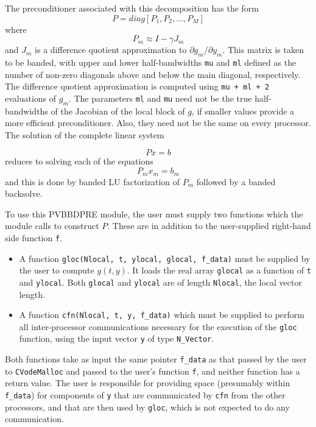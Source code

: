 The preconditioner associated with this decomposition has the form 
\begin{equation}
P= diag[P_1, P_2, \ldots, P_M]
\end{equation}
where 
\begin{equation}
P_m \approx I - \gamma J_m
\end{equation}
and $J_m$ is a difference quotient approximation to 
$\partial g_m/\partial y_m$. This matrix is taken to be banded, with
upper and lower half-bandwidths {\tt mu} and {\tt ml} defined as
the number of non-zero diagonals above and below the main diagonal,
respectively. The difference quotient approximation is computed using
{\tt mu + ml + 2} evaluations of $g_m$. The parameters {\tt ml} and
{\tt mu} need not be the true half-bandwidths of the Jacobian of the
local block of $g$, if smaller values provide a more efficient
preconditioner. Also, they need not be the same on every processor.
The solution of the complete linear system

\begin{equation}
Px = b
\end{equation}
reduces to solving each of the equations 
\begin{equation}
P_m x_m = b_m
\end{equation}
and this is done by banded LU factorization of $P_m$ followed by a banded
backsolve.

To use this PVBBDPRE module, the user must supply two functions which the
module calls to construct $P$. These are in addition to the user-supplied
right-hand side function {\tt f}.

\begin{itemize}

\item A function {\tt gloc(Nlocal, t, ylocal, glocal, f\_data)} must
be supplied by the user to compute $g(t,y)$. It loads the real array
{\tt glocal} as a function of {\tt t} and {\tt ylocal}.  
Both {\tt glocal} and {\tt ylocal} are of length {\tt Nlocal}, the
local vector length.

\item  A function {\tt cfn(Nlocal, t, y, f\_data)} which must be supplied to
perform all inter-processor communications necessary for the execution of
the {\tt gloc} function, using the input vector {\tt y} of type 
{\tt N\_Vector}.
\end{itemize}

Both functions take as input the same pointer {\tt f\_data} as that passed
by the user to {\tt CVodeMalloc} and passed to the user's function {\tt f},
and neither function has a return value. The user is responsible for
providing space (presumably within {\tt f\_data}) for components of {\tt y}
that are communicated by {\tt cfn} from the other processors, and that are
then used by {\tt gloc}, which is not expected to do any communication.

